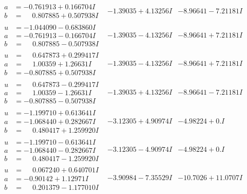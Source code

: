 \documentclass[1p]{elsarticle_modified}
\theoremstyle{definition}
\begin{document}
$$\begin{array}{c|c|c}
\begin{aligned}
a &= -0.761913 + 0.166704 I \\
b &= \phantom{-}0.807885 + 0.507938 I\end{aligned}
 & -1.39035 + 4.13256 I & -8.96641 - 7.21181 I \\ \hline\begin{aligned}
u &= -1.044090 - 0.683860 I \\
a &= -0.761913 - 0.166704 I \\
b &= \phantom{-}0.807885 - 0.507938 I\end{aligned}
 & -1.39035 - 4.13256 I & -8.96641 + 7.21181 I \\ \hline\begin{aligned}
u &= \phantom{-}0.647873 + 0.299417 I \\
a &= \phantom{-}1.00359 + 1.26631 I \\
b &= -0.807885 + 0.507938 I\end{aligned}
 & -1.39035 - 4.13256 I & -8.96641 + 7.21181 I \\ \hline\begin{aligned}
u &= \phantom{-}0.647873 - 0.299417 I \\
a &= \phantom{-}1.00359 - 1.26631 I \\
b &= -0.807885 - 0.507938 I\end{aligned}
 & -1.39035 + 4.13256 I & -8.96641 - 7.21181 I \\ \hline\begin{aligned}
u &= -1.199710 + 0.613641 I \\
a &= -1.068440 + 0.282667 I \\
b &= \phantom{-}0.480417 + 1.259920 I\end{aligned}
 & -3.12305 + 4.90974 I & -4.98224 + 0. I\phantom{ +0.000000I} \\ \hline\begin{aligned}
u &= -1.199710 - 0.613641 I \\
a &= -1.068440 - 0.282667 I \\
b &= \phantom{-}0.480417 - 1.259920 I\end{aligned}
 & -3.12305 - 4.90974 I & -4.98224 + 0. I\phantom{ +0.000000I} \\ \hline\begin{aligned}
u &= \phantom{-}0.067240 + 0.640701 I \\
a &= -0.90142 + 1.12971 I \\
b &= \phantom{-}0.201379 - 1.177010 I\end{aligned}
 & -3.90984 - 7.35529 I & -10.7026 + 11.0707 I \\ \hline\begin{aligned}

\end{aligned}
\end{array}$$
\end{document}
